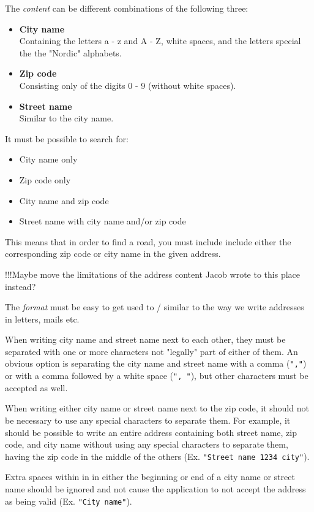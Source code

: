 \documentclass[a4paper,11pt]{article}
\begin{document}
The \textit{content} can be different combinations of the following three:
\begin{itemize}
	\item \textbf{City name} \\
		Containing the letters a - z and A - Z, white spaces, and the letters special the the "Nordic" alphabets.
	\item \textbf{Zip code} \\
		Consisting only of the digits 0 - 9 (without white spaces).
	\item \textbf{Street name} \\
		Similar to the city name.
\end{itemize}
It must be possible to search for:
\begin{itemize}
	\item City name only
	\item Zip code only
	\item City name and zip code
	\item Street name with city name and/or zip code
\end{itemize}
This means that in order to find a road, you must include include either the corresponding zip code or city name in the given address.

!!!Maybe move the limitations of the address content Jacob wrote to this place instead?

The \textit{format} must be easy to get used to / similar to the way we write addresses in letters, mails etc.

When writing city name and street name next to each other, they must be separated with one or more characters not "legally" part of either of them. An obvious option is separating the city name and street name with a comma (\texttt{","}) or with a comma followed by a white space (\texttt{", "}), but other characters must be accepted as well.

When writing either city name or street name next to the zip code, it should not be necessary to use any special characters to separate them. For example, it should be possible to write an entire address containing both street name, zip code, and city name without using any special characters to separate them, having the zip code in the middle of the others (Ex. \texttt{"Street name 1234 city"}).

Extra spaces within in in either the beginning or end of a city name or street name should be ignored and not cause the application to not accept the address as being valid (Ex. \texttt{"City    name"}).
\end{document}
